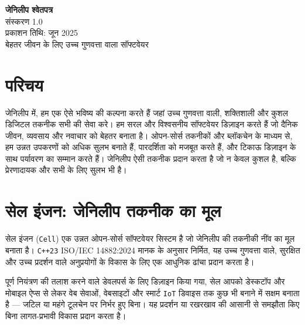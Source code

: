 \documentclass[a4paper,12pt,openany]{book}
\begin{document}
\begin{titlepage}
    \begin{center}
        \vspace*{1.5cm}
        {\Huge \textbf{जेनिलीप श्वेतपत्र}} \\
        \vspace{0.5cm}
        {\Large संस्करण 1.0} \\
        \vspace{0.5cm}
        {\large प्रकाशन तिथि: जून 2025} \\
        \vspace{1.5cm}
        {\large बेहतर जीवन के लिए उच्च गुणवत्ता वाला सॉफ्टवेयर} \\
    \end{center}
    \vfill
\end{titlepage}

\chapter{परिचय}
जेनिलीप में, हम एक ऐसे भविष्य की कल्पना करते हैं जहां उच्च गुणवत्ता वाली, शक्तिशाली और कुशल डिजिटल तकनीक सभी की सेवा करे। हम सरल और विश्वसनीय सॉफ्टवेयर डिज़ाइन करते हैं जो दैनिक जीवन, व्यवसाय और नवाचार को बेहतर बनाता है। ओपन-सोर्स तकनीकों और ब्लॉकचेन के माध्यम से, हम उन्नत उपकरणों को अधिक सुलभ बनाते हैं, पारदर्शिता को मजबूत करते हैं, और टिकाऊ डिज़ाइन के साथ पर्यावरण का सम्मान करते हैं। जेनिलीप ऐसी तकनीक प्रदान करता है जो न केवल कुशल है, बल्कि प्रेरणादायक और सभी के लिए सुलभ भी है।

\chapter{सेल इंजन: जेनिलीप तकनीक का मूल}

सेल इंजन (\texttt{Cell}) एक उन्नत ओपन-सोर्स सॉफ्टवेयर सिस्टम है जो जेनिलीप की तकनीकी नींव का मूल बनाता है। \texttt{C++23} ISO/IEC 14882:2024 मानक के अनुसार निर्मित, यह उच्च गुणवत्ता वाले, सुरक्षित और उच्च प्रदर्शन वाले अनुप्रयोगों के विकास के लिए एक आधुनिक ढांचा प्रदान करता है।

पूर्ण नियंत्रण की तलाश करने वाले डेवलपर्स के लिए डिज़ाइन किया गया, सेल आपको डेस्कटॉप और मोबाइल ऐप्स से लेकर वेब सेवाओं, वेबसाइटों और स्मार्ट \texttt{IoT} डिवाइस तक कुछ भी बनाने में सक्षम बनाता है — जटिल या महंगे टूलचेन पर निर्भर हुए बिना। यह प्रदर्शन या रखरखाव की आसानी से समझौता किए बिना लागत-प्रभावी विकास प्रदान करता है।
\end{document}

